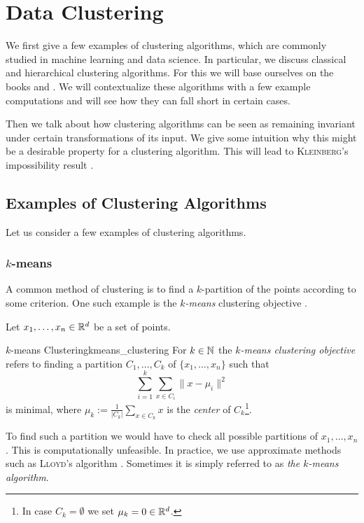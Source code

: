 \chapter{Data Clustering}
\label{chapter__dataclustering}

We first give a few examples of clustering algorithms, which are commonly studied in machine learning and data science. In particular, we discuss classical and hierarchical clustering algorithms. For this we will base ourselves on the books \cite{Everitt2011} and \cite{Scitovski2021}.
We will contextualize these algorithms with a few example computations and will see how they can fall short in certain cases.

Then we talk about how clustering algorithms can be seen as remaining invariant under certain transformations of its input. We give some intuition why this might be a desirable property for a clustering algorithm. This will lead to \textsc{Kleinberg}'s impossibility result \cite{Kleinberg2002}.


\section{Examples of Clustering Algorithms}
Let us consider a few examples of clustering algorithms.

\subsection{$k$-means}
A common method of clustering is to find a $k$-partition of the points according to some criterion.
One such example is the \emph{$k$-means} clustering objective \cite[Sec.~3.1]{Scitovski2021}.

Let $x_1, \dots, x_n \in \mathbb R^d$ be a set of points.

\begin{definition}{$k$-means Clustering}{kmeans_clustering}
For $k \in \mathbb N$ the \emph{$k$-means clustering objective} refers to finding a partition $C_1, \dots, C_k$ of $\{x_1, \dots, x_n\}$ such that
\begin{equation*}
\label{eq:kmean_optimization}
    \sum_{i = 1}^k \sum_{x \in C_i} \|x - \mu_i\|^2
\end{equation*}
is minimal, where $\mu_k := \frac{1}{|C_k|}\sum_{x \in C_k} x$ is the \emph{center} of $C_k$\footnote{In case $C_k = \emptyset$ we set $\mu_k = 0 \in \mathbb R^d$.}.
\end{definition}
To find such a partition we would have to check all possible partitions of $x_1, \dots, x_n$. This is computationally unfeasible. In practice, we use approximate methods such as \textsc{Lloyd}'s algorithm \cite[Sec.~3.1.2]{Scitovski2021}.
Sometimes it is simply referred to as \emph{the $k$-means algorithm}.

